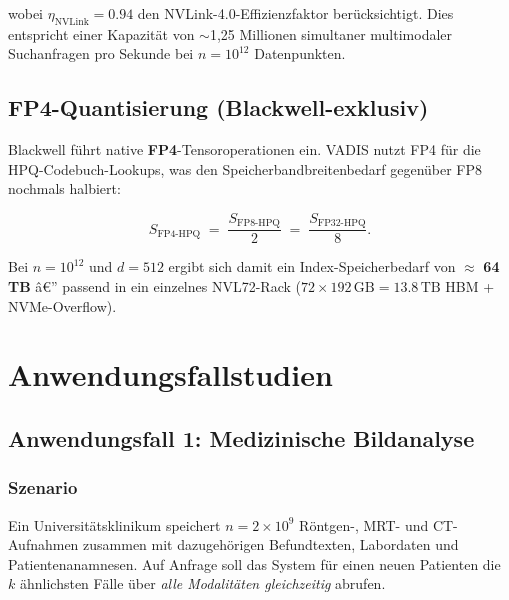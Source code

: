 ﻿\documentclass[12pt,a4paper]{article}
\begin{document}
wobei $\eta_{\text{NVLink}} = 0.94$ den NVLink-4.0-Effizienzfaktor
berücksichtigt. Dies entspricht einer Kapazität von
$\sim$1,25 Millionen simultaner multimodaler Suchanfragen pro Sekunde
bei $n = 10^{12}$ Datenpunkten.

\subsection{FP4-Quantisierung (Blackwell-exklusiv)}

Blackwell führt native \textbf{FP4}-Tensoroperationen ein.
VADIS nutzt FP4 für die HPQ-Codebuch-Lookups, was den
Speicherbandbreitenbedarf gegenüber FP8 nochmals halbiert:

\begin{equation}
  S_{\text{FP4-HPQ}} \;=\; \frac{S_{\text{FP8-HPQ}}}{2}
  \;=\; \frac{S_{\text{FP32-HPQ}}}{8}.
\end{equation}

Bei $n = 10^{12}$ und $d = 512$ ergibt sich damit ein
Index-Speicherbedarf von $\approx$ \textbf{64\,TB} â€” passend in
ein einzelnes NVL72-Rack ($72 \times 192\,\text{GB} = 13.8\,\text{TB}$
HBM + NVMe-Overflow).

\section{Anwendungsfallstudien}
\label{sec:anwendung}

\subsection{Anwendungsfall 1: Medizinische Bildanalyse}

\subsubsection{Szenario}
Ein Universitätsklinikum speichert $n = 2 \times 10^9$ Röntgen-,
MRT- und CT-Aufnahmen zusammen mit dazugehörigen Befundtexten,
Labordaten und Patientenanamnesen. Auf Anfrage soll das System
für einen neuen Patienten die $k$ ähnlichsten Fälle über
\emph{alle Modalitäten gleichzeitig} abrufen.
\end{document}
